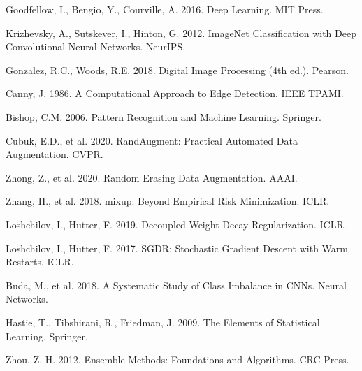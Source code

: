 \documentclass[9pt, a4paper, twocolumn]{article}
\begin{document}
\begin{enumerate}[label={[\arabic*]}, leftmargin=*, itemsep=2pt, parsep=0pt, font=\small]
\begin{sloppypar}
\begin{enumerate}[label={[\arabic*]}, leftmargin=*, itemsep=2pt, parsep=0pt, font=\small]
\item Goodfellow, I., Bengio, Y., Courville, A. 2016. Deep Learning. MIT Press.

\item Krizhevsky, A., Sutskever, I., Hinton, G. 2012. ImageNet Classification with Deep Convolutional Neural Networks. NeurIPS.

\item Gonzalez, R.C., Woods, R.E. 2018. Digital Image Processing (4th ed.). Pearson.

\item Canny, J. 1986. A Computational Approach to Edge Detection. IEEE TPAMI.

\item Bishop, C.M. 2006. Pattern Recognition and Machine Learning. Springer.

\item Cubuk, E.D., et al. 2020. RandAugment: Practical Automated Data Augmentation. CVPR.

\item Zhong, Z., et al. 2020. Random Erasing Data Augmentation. AAAI.

\item Zhang, H., et al. 2018. mixup: Beyond Empirical Risk Minimization. ICLR.

\item Loshchilov, I., Hutter, F. 2019. Decoupled Weight Decay Regularization. ICLR.

\item Loshchilov, I., Hutter, F. 2017. SGDR: Stochastic Gradient Descent with Warm Restarts. ICLR.

\item Buda, M., et al. 2018. A Systematic Study of Class Imbalance in CNNs. Neural Networks.

\item Hastie, T., Tibshirani, R., Friedman, J. 2009. The Elements of Statistical Learning. Springer.

\item Zhou, Z.-H. 2012. Ensemble Methods: Foundations and Algorithms. CRC Press.

\end{enumerate}
\end{sloppypar}

\end{enumerate}
\end{document}
